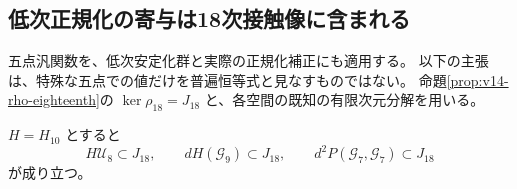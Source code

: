 \subsection{低次正規化の寄与は18次接触像に含まれる}
\label{subsec:v14-lower-normalizers-vanish}

五点汎関数を、低次安定化群と実際の正規化補正にも適用する。
以下の主張は、特殊な五点での値だけを普遍恒等式と見なすものではない。
命題\ref{prop:v14-rho-eighteenth}の $\ker\rho_{18}=J_{18}$ と、各空間の既知の有限次元分解を用いる。

\begin{proposition}
\label{prop:v14-all-lower-corrections-in-image}
$H=H_{10}$ とすると
\[
 H\mathcal U_8\subset J_{18},\qquad
 dH(\mathcal G_9)\subset J_{18},\qquad
 d^2P(\mathcal G_7,\mathcal G_7)\subset J_{18}
\]
が成り立つ。
\end{proposition}

